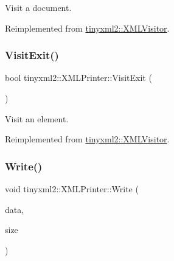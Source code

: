 Visit a document. 



Reimplemented from \mbox{\hyperlink{classtinyxml2_1_1_x_m_l_visitor_a170e9989cd046ba904f302d087e07086}{tinyxml2\+::\+X\+M\+L\+Visitor}}.

\mbox{\label{classtinyxml2_1_1_x_m_l_printer_a2edd48405971a88951c71c9df86a2f50}} 
\subsubsection{\texorpdfstring{Visit\+Exit()}{VisitExit()}\hspace{0.1cm}{\footnotesize\ttfamily [2/2]}}
{\footnotesize\ttfamily bool tinyxml2\+::\+X\+M\+L\+Printer\+::\+Visit\+Exit (\begin{DoxyParamCaption}\item[{const \mbox{\hyperlink{classtinyxml2_1_1_x_m_l_element}{X\+M\+L\+Element}} \&}]{ }\end{DoxyParamCaption})\hspace{0.3cm}{\ttfamily [virtual]}}



Visit an element. 



Reimplemented from \mbox{\hyperlink{classtinyxml2_1_1_x_m_l_visitor_a772f10ddc83f881956d32628faa16eb6}{tinyxml2\+::\+X\+M\+L\+Visitor}}.

\mbox{\label{classtinyxml2_1_1_x_m_l_printer_aff363b7634a27538fd691ae62adbda63}} 
\subsubsection{\texorpdfstring{Write()}{Write()}\hspace{0.1cm}{\footnotesize\ttfamily [1/2]}}
{\footnotesize\ttfamily void tinyxml2\+::\+X\+M\+L\+Printer\+::\+Write (\begin{DoxyParamCaption}\item[{const char $\ast$}]{data,  }\item[{size\+\_\+t}]{size }\end{DoxyParamCaption})\hspace{0.3cm}{\ttfamily [protected]}}

